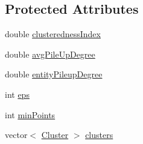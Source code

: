 \subsection*{Protected Attributes}
\begin{DoxyCompactItemize}
\item 
double \hyperlink{classmultiscale_1_1analysis_1_1ClusterDetector_a5e2bf77041bd0d5047dd16c4632c16b7}{clusteredness\-Index}
\item 
double \hyperlink{classmultiscale_1_1analysis_1_1ClusterDetector_a6f6cfa50cf21ac400d41d6c6f2112bc9}{avg\-Pile\-Up\-Degree}
\item 
double \hyperlink{classmultiscale_1_1analysis_1_1ClusterDetector_aaa93a4b3a5a3c4279aa434669093ac40}{entity\-Pileup\-Degree}
\item 
int \hyperlink{classmultiscale_1_1analysis_1_1ClusterDetector_a61e876f87d62245eada8f56d587d39cd}{eps}
\item 
int \hyperlink{classmultiscale_1_1analysis_1_1ClusterDetector_aa94df1adc462be5931ec25ba24122fe9}{min\-Points}
\item 
vector$<$ \hyperlink{classmultiscale_1_1analysis_1_1Cluster}{Cluster} $>$ \hyperlink{classmultiscale_1_1analysis_1_1ClusterDetector_aa81a8649bc743389c2fc1919d47eb5b3}{clusters}
\end{DoxyCompactItemize}
